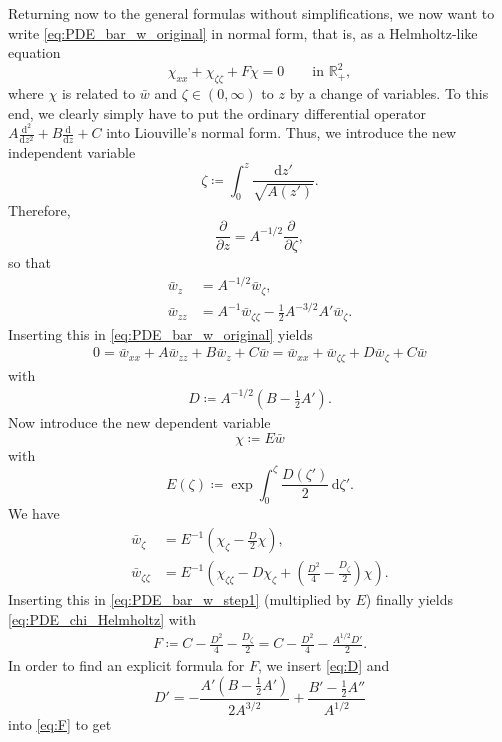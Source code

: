 \documentclass[11pt,twoside,reqno,centertags]{amsart}
\theoremstyle{definition}
\newcommand{\R}{\mathbb R}
\newcommand{\dd}{\mathrm d}
\begin{document}
Returning now to the general formulas without simplifications, we now want to write \eqref{eq:PDE_bar_w_original} in normal form, that is, as a Helmholtz-like equation
\begin{equation}\label{eq:PDE_chi_Helmholtz}
	\chi_{xx}+\chi_{\zeta\zeta}+F\chi=0 \qquad \text{in }\R^2_+,
\end{equation}
where $\chi$ is related to $\bar w$ and $\zeta\in(0,\infty)$ to $z$ by a change of variables. To this end, we clearly simply have to put the ordinary differential operator $A\frac{\dd^2}{\dd z^2}+B\frac{\dd}{\dd z}+C$ into Liouville's normal form. Thus, we introduce the new independent variable
\[\zeta\coloneqq\int_0^z\frac{\dd z'}{\sqrt{A(z')}}.\]
Therefore,
\[\frac{\partial}{\partial z}=A^{-1/2}\frac{\partial}{\partial\zeta},\]
so that
\begin{align*}
	\bar w_z&=A^{-1/2}\bar w_\zeta,\\
	\bar w_{zz}&=A^{-1}\bar w_{\zeta\zeta}-\frac12A^{-3/2}A'\bar w_\zeta.
\end{align*}
Inserting this in \eqref{eq:PDE_bar_w_original} yields
\begin{align}\label{eq:PDE_bar_w_step1}
	0=\bar w_{xx}+A\bar w_{zz}+B\bar w_z+C\bar w=\bar w_{xx}+\bar w_{\zeta\zeta}+D\bar w_\zeta+C\bar w
\end{align}
with
\begin{align}\label{eq:D}
	D\coloneqq A^{-1/2}\left(B-\frac12A'\right).
\end{align}
Now introduce the new dependent variable
\[\chi\coloneqq E\bar w\]
with
\begin{equation}\label{eq:E}
	E(\zeta)\coloneqq\exp\int_0^\zeta\frac{D(\zeta')}{2}\,\dd\zeta'.
\end{equation}
We have
\begin{align*}
	\bar w_\zeta&=E^{-1}\left(\chi_\zeta-\frac D2\chi\right),\\
	\bar w_{\zeta\zeta}&=E^{-1}\left(\chi_{\zeta\zeta}-D\chi_\zeta+\left(\frac{D^2}{4}-\frac{D_\zeta}{2}\right)\chi\right).
\end{align*}
Inserting this in \eqref{eq:PDE_bar_w_step1} (multiplied by $E$) finally yields \eqref{eq:PDE_chi_Helmholtz}
with
\begin{align}\label{eq:F}
	F\coloneqq C-\frac{D^2}{4}-\frac{D_\zeta}{2}=C-\frac{D^2}{4}-\frac{A^{1/2}D'}{2}.
\end{align}
In order to find an explicit formula for $F$, we insert \eqref{eq:D} and
\[D'=-\frac{A'(B-\frac12A')}{2A^{3/2}}+\frac{B'-\frac12A''}{A^{1/2}}\]
into \eqref{eq:F} to get
\end{document}
